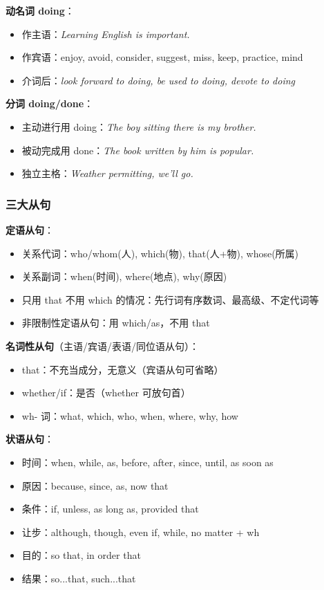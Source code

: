 \textbf{动名词 doing}：
\begin{itemize}
  \item 作主语：\textit{Learning English is important.}
  \item 作宾语：enjoy, avoid, consider, suggest, miss, keep, practice, mind
  \item 介词后：\textit{look forward to doing, be used to doing, devote to doing}
\end{itemize}

\textbf{分词 doing/done}：
\begin{itemize}
  \item 主动进行用 doing：\textit{The boy sitting there is my brother.}
  \item 被动完成用 done：\textit{The book written by him is popular.}
  \item 独立主格：\textit{Weather permitting, we'll go.}
\end{itemize}

\subsubsection{三大从句}

\textbf{定语从句}：
\begin{itemize}
  \item 关系代词：who/whom(人), which(物), that(人+物), whose(所属)
  \item 关系副词：when(时间), where(地点), why(原因)
  \item 只用 that 不用 which 的情况：先行词有序数词、最高级、不定代词等
  \item 非限制性定语从句：用 which/as，不用 that
\end{itemize}

\textbf{名词性从句}（主语/宾语/表语/同位语从句）：
\begin{itemize}
  \item that：不充当成分，无意义（宾语从句可省略）
  \item whether/if：是否（whether 可放句首）
  \item wh- 词：what, which, who, when, where, why, how
\end{itemize}

\textbf{状语从句}：
\begin{itemize}
  \item 时间：when, while, as, before, after, since, until, as soon as
  \item 原因：because, since, as, now that
  \item 条件：if, unless, as long as, provided that
  \item 让步：although, though, even if, while, no matter + wh
  \item 目的：so that, in order that
  \item 结果：so...that, such...that
\end{itemize}

